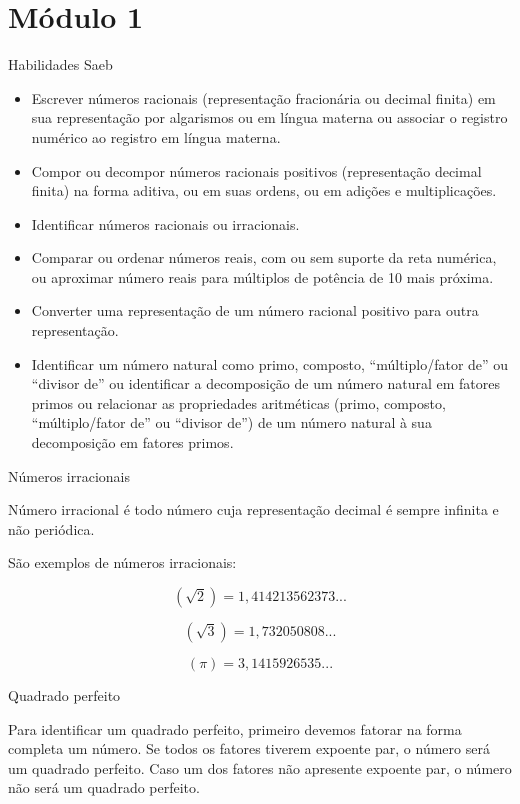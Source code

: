 \section{Módulo 1}

Habilidades Saeb

\begin{itemize}
\item
  Escrever números racionais (representação fracionária ou decimal
  finita) em sua representação por algarismos ou em língua materna ou
  associar o registro numérico ao registro em língua materna.
\item
  Compor ou decompor números racionais positivos (representação decimal
  finita) na forma aditiva, ou em suas ordens, ou em adições e
  multiplicações.
\item
  Identificar números racionais ou irracionais.
\item
  Comparar ou ordenar números reais, com ou sem suporte da reta
  numérica, ou aproximar número reais para múltiplos de potência de 10
  mais próxima.
\item
  Converter uma representação de um número racional positivo para outra
  representação.
\item
  Identificar um número natural como primo, composto, ``múltiplo/fator
  de'' ou ``divisor de'' ou identificar a decomposição de um número
  natural em fatores primos ou relacionar as propriedades aritméticas
  (primo, composto, ``múltiplo/fator de'' ou ``divisor de'') de um
  número natural à sua decomposição em fatores primos.
\end{itemize}

Números irracionais

Número irracional é todo número cuja representação decimal é sempre
infinita e não periódica.

São exemplos de números irracionais:

$$(\sqrt{2})=1,414213562373...$$

$$(\sqrt{3}) = 1,732050808...$$

$$(\pi) = 3,1415926535...$$

Quadrado perfeito

Para identificar um quadrado perfeito, primeiro devemos fatorar na forma
completa um número. Se todos os fatores tiverem expoente par, o número
será um quadrado perfeito. Caso um dos fatores não apresente expoente
par, o número não será um quadrado perfeito.


